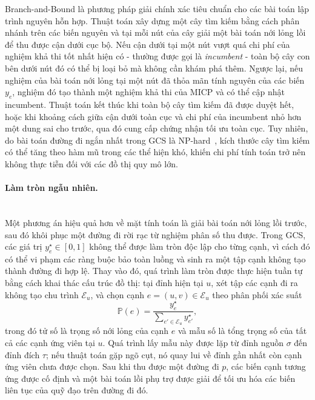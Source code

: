 Branch-and-Bound là phương pháp giải chính xác tiêu chuẩn cho các bài toán lập trình nguyên hỗn hợp.
Thuật toán xây dựng một cây tìm kiếm bằng cách phân nhánh trên các biến nguyên và tại mỗi nút của cây giải một bài toán nới lỏng lồi để thu được cận dưới cục bộ.
Nếu cận dưới tại một nút vượt quá chi phí của nghiệm khả thi tốt nhất hiện có - thường được gọi là \emph{incumbent} - toàn bộ cây con bên dưới nút đó có thể bị loại bỏ mà không cần khám phá thêm.
Ngược lại, nếu nghiệm của bài toán nới lỏng tại một nút đã thỏa mãn tính nguyên của các biến $y_e$, nghiệm đó tạo thành một nghiệm khả thi của MICP và có thể cập nhật incumbent.
Thuật toán kết thúc khi toàn bộ cây tìm kiếm đã được duyệt hết, hoặc khi khoảng cách giữa cận dưới toàn cục và chi phí của incumbent nhỏ hơn một dung sai cho trước, qua đó cung cấp chứng nhận tối ưu toàn cục.
Tuy nhiên, do bài toán đường đi ngắn nhất trong GCS là NP-hard~\cite{MarcucciEtAl2023GCS,Marcucci2024Thesis}, kích thước cây tìm kiếm có thể tăng theo hàm mũ trong các thể hiện khó, khiến chi phí tính toán trở nên không thực tiễn đối với các đồ thị quy mô lớn.

\paragraph{Làm tròn ngẫu nhiên.}\mbox{}\\

Một phương án hiệu quả hơn về mặt tính toán là giải bài toán nới lỏng lồi trước, sau đó khôi phục một đường đi rời rạc từ nghiệm phân số thu được.
Trong GCS, các giá trị $y_e^\star \in [0,1]$ không thể được làm tròn độc lập cho từng cạnh, vì cách đó có thể vi phạm các ràng buộc bảo toàn luồng và sinh ra một tập cạnh không tạo thành đường đi hợp lệ.
Thay vào đó, quá trình làm tròn được thực hiện tuần tự bằng cách khai thác cấu trúc đồ thị: tại đỉnh hiện tại $u$, xét tập các cạnh đi ra không tạo chu trình $\mathcal{E}_u$, và chọn cạnh $e = (u,v) \in \mathcal{E}_u$ theo phân phối xác suất
\begin{equation}
    \mathbb{P}(e)
    =
    \frac{y_e^\star}{\displaystyle\sum_{e' \in \mathcal{E}_u} y_{e'}^\star},
    \label{eq:gcs_randomized_rounding_prob}
\end{equation}
trong đó tử số là trọng số nới lỏng của cạnh $e$ và mẫu số là tổng trọng số của tất cả các cạnh ứng viên tại $u$.
Quá trình lấy mẫu này được lặp từ đỉnh nguồn $\sigma$ đến đỉnh đích $\tau$; nếu thuật toán gặp ngõ cụt, nó quay lui về đỉnh gần nhất còn cạnh ứng viên chưa được chọn.
Sau khi thu được một đường đi $p$, các biến cạnh tương ứng được cố định và một bài toán lồi phụ trợ được giải để tối ưu hóa các biến liên tục của quỹ đạo trên đường đi đó.

